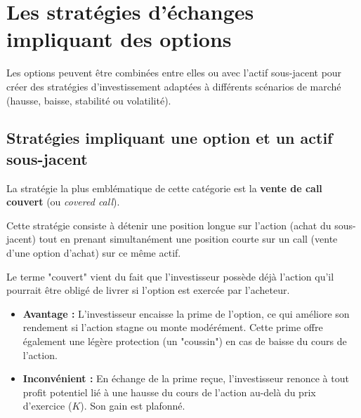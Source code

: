 \section{Les stratégies d'échanges impliquant des options}

Les options peuvent être combinées entre elles ou avec l'actif sous-jacent pour créer des stratégies d'investissement adaptées à différents scénarios de marché (hausse, baisse, stabilité ou volatilité).

\subsection{Stratégies impliquant une option et un actif sous-jacent}

La stratégie la plus emblématique de cette catégorie est la \textbf{vente de call couvert} (ou \textit{covered call}).

\begin{definitionbox}
Cette stratégie consiste à détenir une position longue sur l'action (achat du sous-jacent) tout en prenant simultanément une position courte sur un call (vente d'une option d'achat) sur ce même actif.
\end{definitionbox}

\begin{intuitionbox}
Le terme "couvert" vient du fait que l'investisseur possède déjà l'action qu'il pourrait être obligé de livrer si l'option est exercée par l'acheteur.
\begin{itemize}
    \item \textbf{Avantage :} L'investisseur encaisse la prime de l'option, ce qui améliore son rendement si l'action stagne ou monte modérément. Cette prime offre également une légère protection (un "coussin") en cas de baisse du cours de l'action.
    \item \textbf{Inconvénient :} En échange de la prime reçue, l'investisseur renonce à tout profit potentiel lié à une hausse du cours de l'action au-delà du prix d'exercice ($K$). Son gain est plafonné.
\end{itemize}
\end{intuitionbox}

\begin{center}
\end{center}

